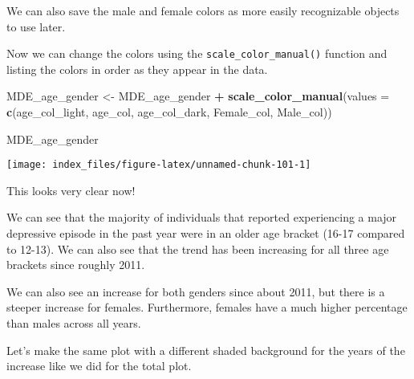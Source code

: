 \documentclass[
]{article}
\newenvironment{Shaded}{\begin{snugshade}}{\end{snugshade}}
\newcommand{\DataTypeTok}[1]{\textcolor[rgb]{0.13,0.29,0.53}{#1}}
\newcommand{\KeywordTok}[1]{\textcolor[rgb]{0.13,0.29,0.53}{\textbf{#1}}}
\newcommand{\NormalTok}[1]{#1}
\newcommand{\OperatorTok}[1]{\textcolor[rgb]{0.81,0.36,0.00}{\textbf{#1}}}
\newcommand{\StringTok}[1]{\textcolor[rgb]{0.31,0.60,0.02}{#1}}
\begin{document}
We can also save the male and female colors as more easily recognizable
objects to use later.

\begin{Shaded}
\end{Shaded}

Now we can change the colors using the \texttt{scale\_color\_manual()}
function and listing the colors in order as they appear in the data.

\begin{Shaded}
\begin{Highlighting}[]
\NormalTok{MDE_age_gender <-}\StringTok{ }\NormalTok{MDE_age_gender  }\OperatorTok{+}
\StringTok{  }\KeywordTok{scale_color_manual}\NormalTok{(}\DataTypeTok{values =} \KeywordTok{c}\NormalTok{(age_col_light, }
\NormalTok{                                age_col, }
\NormalTok{                                age_col_dark, }
\NormalTok{                                Female_col, }
\NormalTok{                                Male_col))}

\NormalTok{MDE_age_gender}
\end{Highlighting}
\end{Shaded}

\begin{center}\texttt{[image: index\_files/figure-latex/unnamed-chunk-101-1]} \end{center}

This looks very clear now!

We can see that the majority of individuals that reported experiencing a
major depressive episode in the past year were in an older age bracket
(16-17 compared to 12-13). We can also see that the trend has been
increasing for all three age brackets since roughly 2011.

We can also see an increase for both genders since about 2011, but there
is a steeper increase for females. Furthermore, females have a much
higher percentage than males across all years.

Let's make the same plot with a different shaded background for the
years of the increase like we did for the total plot.

\hypertarget{section-22}{%
\paragraph{}\label{section-22}}
\end{document}
